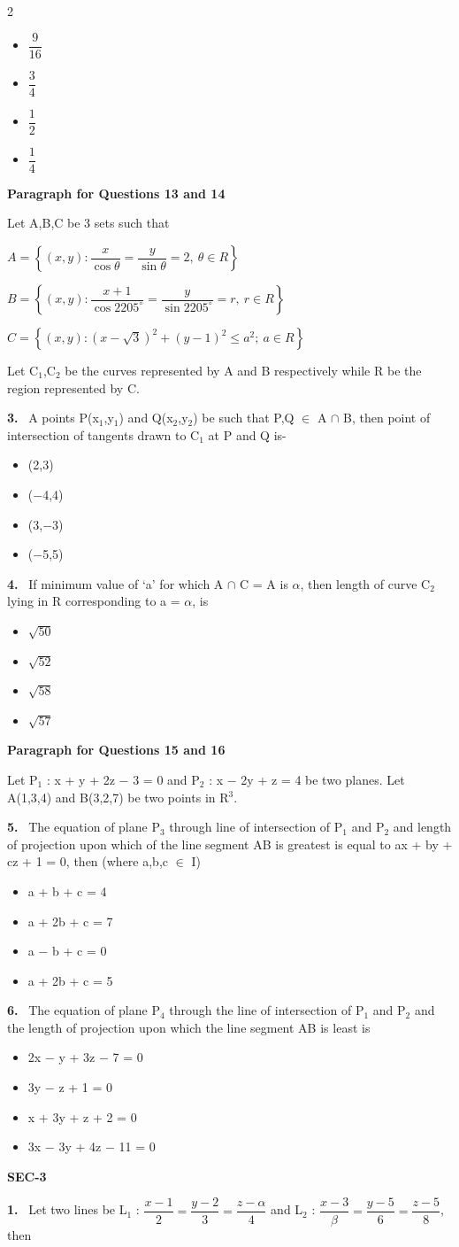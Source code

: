 \documentclass[10pt]{extarticle}
\newcommand{\sect}[1]{\par\smallskip\noindent\textbf{#1}\par}
\newcommand{\qn}[1]{\par\smallskip\noindent\textbf{#1.}~}
\newcommand{\paraq}[2]{\par\smallskip\noindent\textbf{Paragraph for Questions #1 and #2}\par}
\newenvironment{qoptions}{\begin{itemize}[leftmargin=1.8em,itemsep=1pt,topsep=2pt,label={}]}{\end{itemize}}
\newcommand{\opt}[2]{\item[(#1)] #2}
\begin{document}
\begin{multicols}{2}
\begin{qoptions}
\opt{A}{$\dfrac{9}{16}$}
\opt{B}{$\dfrac{3}{4}$}
\opt{C}{$\dfrac{1}{2}$}
\opt{D}{$\dfrac{1}{4}$}
\end{qoptions}
\paraq{13}{14}
Let A,B,C be 3 sets such that\par
$A=\left\{(x,y):\dfrac{x}{\cos\theta}=\dfrac{y}{\sin\theta}=2,\ \theta\in R\right\}$\par
$B=\left\{(x,y):\dfrac{x+1}{\cos2205^\circ}=\dfrac{y}{\sin2205^\circ}=r,\ r\in R\right\}$\par
$C=\left\{(x,y):(x-\sqrt{3})^2+(y-1)^2\leqslant a^2;\ a\in R\right\}$\par
Let C$_1$,C$_2$ be the curves represented by A and B respectively while R be the region represented by C.
\qn{3} A points P(x$_1$,y$_1$) and Q(x$_2$,y$_2$) be such that P,Q $\in$ A $\cap$ B, then point of intersection of tangents drawn to C$_1$ at P and Q is-
\begin{qoptions}
\opt{A}{(2,3)}
\opt{B}{($-$4,4)}
\opt{C}{(3,$-$3)}
\opt{D}{($-$5,5)}
\end{qoptions}
\qn{4} If minimum value of `a' for which A $\cap$ C = A is $\alpha$, then length of curve C$_2$ lying in R corresponding to a = $\alpha$, is
\begin{qoptions}
\opt{A}{$\sqrt{50}$}
\opt{B}{$\sqrt{52}$}
\opt{C}{$\sqrt{58}$}
\opt{D}{$\sqrt{57}$}
\end{qoptions}
\paraq{15}{16}
Let P$_1$ : x + y + 2z $-$ 3 = 0 and P$_2$ : x $-$ 2y + z = 4 be two planes. Let A(1,3,4) and B(3,2,7) be two points in R$^3$.
\qn{5} The equation of plane P$_3$ through line of intersection of P$_1$ and P$_2$ and length of projection upon which of the line segment AB is greatest is equal to ax + by + cz + 1 = 0, then (where a,b,c $\in$ I)
\begin{qoptions}
\opt{A}{a + b + c = 4}
\opt{B}{a + 2b + c = 7}
\opt{C}{a $-$ b + c = 0}
\opt{D}{a + 2b + c = 5}
\end{qoptions}
\qn{6} The equation of plane P$_4$ through the line of intersection of P$_1$ and P$_2$ and the length of projection upon which the line segment AB is least is
\begin{qoptions}
\opt{A}{2x $-$ y + 3z $-$ 7 = 0}
\opt{B}{3y $-$ z + 1 = 0}
\opt{C}{x + 3y + z + 2 = 0}
\opt{D}{3x $-$ 3y + 4z $-$ 11 = 0}
\end{qoptions}
\sect{SEC-3}
\qn{1} Let two lines be L$_1$ : $\dfrac{x-1}{2}=\dfrac{y-2}{3}=\dfrac{z-\alpha}{4}$ and L$_2$ : $\dfrac{x-3}{\beta}=\dfrac{y-5}{6}=\dfrac{z-5}{8}$, then\par

\end{multicols}
\end{document}

